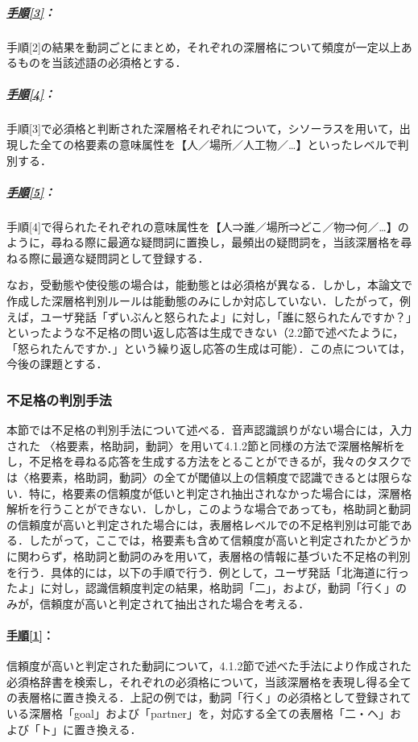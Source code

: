 \documentclass[japanese]{jnlp_1.4}
\begin{document}
\subparagraph{\underline{手順[3]}：}手順[2]の結果を動詞ごとにまとめ，それぞれの深層格について頻度が一定以上あるものを当該述語の必須格とする．


\subparagraph{\underline{手順[4]}：}手順[3]で必須格と判断された深層格それぞれについて，シソーラスを用いて，出現した全ての格要素の意味属性を【人／場所／人工物／…】といったレベルで判別する．


\subparagraph{\underline{手順[5]}：}手順[4]で得られたそれぞれの意味属性を【人⇒誰／場所⇒どこ／物⇒何／…】のように，尋ねる際に最適な疑問詞に置換し，最頻出の疑問詞を，当該深層格を尋ねる際に最適な疑問詞として登録する．

なお，受動態や使役態の場合は，能動態とは必須格が異なる．しかし，本論文で作成した深層格判別ルールは能動態のみにしか対応していない．したがって，例えば，ユーザ発話「ずいぶんと怒られたよ」に対し，「誰に怒られたんですか？」といったような不足格の問い返し応答は生成できない（2.2節で述べたように，「怒られたんですか．」という繰り返し応答の生成は可能）．この点については，今後の課題とする．
 
 
 
 
\subsubsection{不足格の判別手法}

本節では不足格の判別手法について述べる．音声認識誤りがない場合には，入力された 〈格要素，格助詞，動詞〉を用いて4.1.2節と同様の方法で深層格解析をし，不足格を尋ねる応答を生成する方法をとることができるが，我々のタスクでは〈格要素，格助詞，動詞〉の全てが閾値以上の信頼度で認識できるとは限らない．特に，格要素の信頼度が低いと判定され抽出されなかった場合には，深層格解析を行うことができない．しかし，このような場合であっても，格助詞と動詞の信頼度が高いと判定された場合には，表層格レベルでの不足格判別は可能である．したがって，ここでは，格要素も含めて信頼度が高いと判定されたかどうかに関わらず，格助詞と動詞のみを用いて，表層格の情報に基づいた不足格の判別を行う．具体的には，以下の手順で行う．例として，ユーザ発話「北海道に行ったよ」に対し，認識信頼度判定の結果，格助詞「二」，および，動詞「行く」のみが，信頼度が高いと判定されて抽出された場合を考える．
 

\paragraph{\underline{手順[1]}：}信頼度が高いと判定された動詞について，4.1.2節で述べた手法により作成された必須格辞書を検索し，それぞれの必須格について，当該深層格を表現し得る全ての表層格に置き換える．上記の例では，動詞「行く」の必須格として登録されている深層格「goal」および「partner」を，対応する全ての表層格「二・ヘ」および「ト」に置き換える．
 
\end{document}
